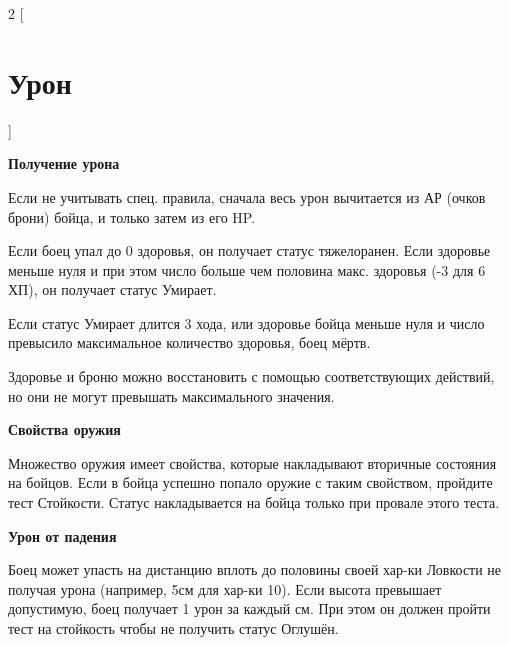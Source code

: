 \begin{multicols}{2}
    [
    \section{Урон}
    ]    

    \textbf{Получение урона}

    Если не учитывать спец. правила, сначала весь урон вычитается из АР (очков брони) бойца, и только затем из его HP. 

    Если боец упал до 0 здоровья, он получает статус тяжелоранен. Если здоровье меньше нуля 
    и при этом число больше чем половина макс. здоровья (-3 для 6 ХП), он получает статус Умирает.

    Если статус Умирает длится 3 хода, или здоровье бойца меньше нуля и число превысило максимальное количество здоровья, боец мёртв.
    
    Здоровье и броню можно восстановить с помощью соответствующих действий, но они не могут превышать максимального значения.

    \textbf{Свойства оружия}

    Множество оружия имеет свойства, которые накладывают вторичные состояния на бойцов. Если в бойца успешно попало оружие с таким свойством, пройдите 
    тест Стойкости. Статус накладывается на бойца только при провале этого теста.

    \textbf{Урон от падения}

    Боец может упасть на дистанцию вплоть до половины своей хар-ки Ловкости не получая урона (например, 5см для хар-ки 10). Если высота
    превышает допустимую, боец получает 1 урон за каждый см. При этом он должен пройти тест на стойкость чтобы не получить статус Оглушён.
\end{multicols}